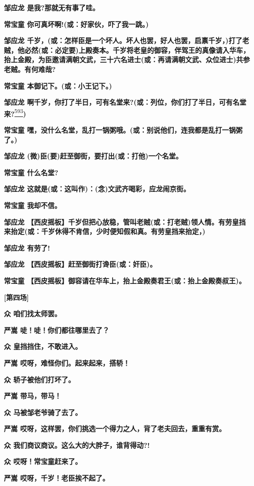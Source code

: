 \textbf{邹应龙 是我?那就无有事了哇。}

\textbf{常宝童 你可真坏啊!(或：好家伙，吓了我一跳。)}

\textbf{邹应龙
千岁，(或：怎样臣是一个坏人。坏人也罢，好人也罢，启禀千岁，)打了老贼，他必然(或：必定要)上殿奏本。千岁将老皇的御容，伴驾王的真像请入华车，抬上金殿，为臣邀请满朝文武，三十六名进士(或：再请满朝文武、众位进士)共参老贼。有何难哉?}

\textbf{常宝童 本御记下。(或：小王记下。)}

\textbf{邹应龙
啊千岁，你打了半日，可有名堂来?(或：列位，你们打了半日，可有名堂来?}\protect\hyperlink{fn593}{\textsuperscript{593}}\textbf{)}

\textbf{常宝童
嘿，没什么名堂，乱打一锅粥哦。(或：别说他们，连我都是乱打一锅粥了。)}

\textbf{邹应龙 (微)臣(要)赶至御街，要打出(或：打他)一个名堂。}

\textbf{常宝童 什么名堂?}

\textbf{邹应龙 这就是(或：这叫作)：(念)文武齐喝彩，应龙闹京街。}

\textbf{常宝童 我却不信。}

\textbf{邹应龙
【西皮摇板】千岁但把心放稳，管叫老贼(或：打老贼)领人情。有劳皇挡来抬定(或：千岁休得不肯信，少时便知假和真。有劳皇挡来抬定，)}

\textbf{邹应龙 有劳了!}

\textbf{邹应龙 【西皮摇板】赶至御街打谗臣(或：奸臣)。}

\textbf{常宝童
【西皮摇板】御容请在华车上，抬上金殿奏君王(或：抬上金殿奏叔王)。}

\textbf{{[}第四场{]}}

\textbf{众 咱们找太师罢。}

\textbf{严嵩 唗！唗！你们都往哪里去了？}

\textbf{众 皇挡挡住，不敢进入。}

\textbf{严嵩 哎呀，难怪你们。起来起来，搭轿！}

\textbf{众 轿子被他们打坏了。}

\textbf{严嵩 带马，带马！}

\textbf{众 马被邹老爷骑了去了。}

\textbf{严嵩
哎呀，这样罢，你们挑选一个得力之人，背了老夫回去，重重有赏。}

\textbf{众 我们商议商议。这么大的大胖子，谁背得动?!}

\textbf{众 哎呀！常宝童赶来了。}

\textbf{严嵩 哎呀，千岁！老臣挨不起了。}

